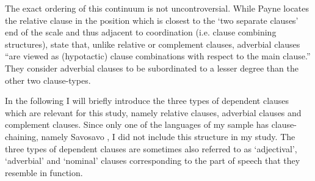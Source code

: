 The exact ordering of this continuum is not uncontroversial. 
While Payne locates the relative clause in the position which is closest to the `two separate clauses' end of the scale and thus adjacent to coordination (i.e. clause combining structures), \citet[238]{Adverbial} state that, unlike relative or complement clauses, adverbial clauses ``are viewed as (hypotactic) clause combinations with respect to the main clause.'' 
They consider adverbial clauses to be subordinated to a lesser degree than the other two clause-types.   

In the following I will briefly introduce the three types of dependent clauses which are relevant for this study, namely relative clauses, adverbial clauses and complement clauses.
Since only one of the languages of my sample has clause-chaining, namely Savosavo \citep[286--297]{Wegener:2008}, I did not include this structure in my study. 
The three types of dependent clauses are sometimes also referred to as `adjectival', `adverbial' and `nominal' clauses corresponding to the part of speech that they resemble in function.

